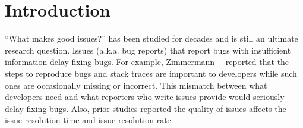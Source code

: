 \section{Introduction}
\label{sec:intro}
``What makes good issues?'' has been studied for decades and 
is still an ultimate research question. 
Issues (a.k.a. bug reports) that report bugs with 
insufficient information delay fixing bugs. 
For example, Zimmermann~\et~\citep{zimmermann2010TSE} reported 
that the steps to reproduce bugs and stack traces are important 
to developers while such ones are occasionally missing or incorrect. 
This mismatch between what developers need and 
what reporters who write issues provide would seriously delay fixing bugs. 
Also, prior studies reported the quality of issues affects 
the issue resolution time and 
issue resolution rate. 






